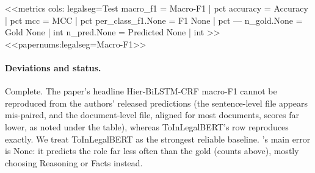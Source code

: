 <<metrics
cols: legalseg=Test
macro_f1 = Macro-F1 | pct
accuracy = Accuracy | pct
mcc = MCC | pct
per_class_f1.None = F1 None | pct
---
n_gold.None = Gold None | int
n_pred.None = Predicted None | int
>>
<<papernums:legalseg=Macro-F1>>

\paragraph{Deviations and status.} Complete. The paper's headline Hier-BiLSTM-CRF macro-F1 cannot be reproduced from
the authors' released predictions (the sentence-level file appears mis-paired, and the document-level file, aligned for
most documents, scores far lower, as noted under the table), whereas
ToInLegalBERT's row reproduces exactly. We treat ToInLegalBERT as the strongest reliable baseline. \jev{}'s main error
is None: it predicts the role far less often than the gold (counts above), mostly choosing Reasoning or Facts instead.
